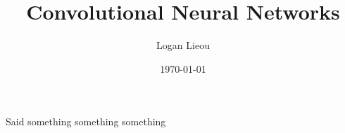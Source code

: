 \documentclass[11pt]{article}
\begin{document}
\title{Convolutional Neural Networks}
\author{Logan Lieou}
\date{\today}
\maketitle{}

Said something something something ~\cite{a2017}

{}

\end{document}
